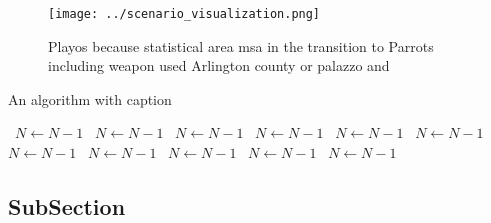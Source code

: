\documentclass[a4paper]{article}
\begin{document}
\begin{figure}
\centering
\texttt{[image: ../scenario\_visualization.png]}
\caption{Playos because statistical area msa in the transition to Parrots including weapon used Arlington county or palazzo and 
}
\end{figure}
 
\begin{algorithm}
\caption{An algorithm with caption}
\begin{algorithmic}
\    \State $N \gets N - 1$
\    \State $N \gets N - 1$
\    \State $N \gets N - 1$
\    \State $N \gets N - 1$
\    \State $N \gets N - 1$
\    \State $N \gets N - 1$
\    \State $N \gets N - 1$
\    \State $N \gets N - 1$
\    \State $N \gets N - 1$
\    \State $N \gets N - 1$
\    \State $N \gets N - 1$
\EndWhile
\end{algorithmic}
\end{algorithm}

\subsection{SubSection}
\end{document}
